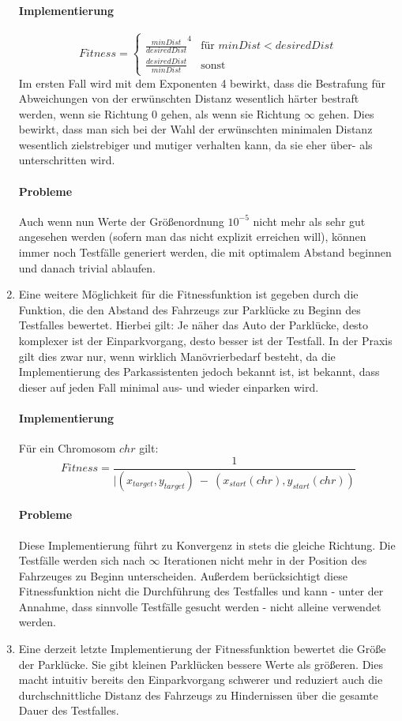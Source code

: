 \documentclass[12pt,a4paper]{scrartcl}
\begin{document}
\begin{enumerate}
	\paragraph{Implementierung}
	\begin{equation}
	Fitness = 
	\begin{cases}
		\frac{minDist}{desiredDist}^4 & \text{für } minDist < desiredDist \\
		\frac{desiredDist}{minDist} & \text{sonst}
	\end{cases}
	\end{equation}
	Im ersten Fall wird mit dem Exponenten 4 bewirkt, dass die Bestrafung für Abweichungen von der erwünschten Distanz wesentlich härter bestraft werden, wenn sie Richtung 0 gehen, als wenn sie Richtung $\infty$ gehen. Dies bewirkt, dass man sich bei der Wahl der erwünschten minimalen Distanz wesentlich zielstrebiger und mutiger verhalten kann, da sie eher über- als unterschritten wird.
	\paragraph{Probleme} Auch wenn nun Werte der Größenordnung $10^{-5}$ nicht mehr als sehr gut angesehen werden (sofern man das nicht explizit erreichen will), können immer noch Testfälle generiert werden, die mit optimalem Abstand beginnen und danach trivial ablaufen.
	\item Eine weitere Möglichkeit für die Fitnessfunktion ist gegeben durch die Funktion, die den Abstand des Fahrzeugs zur Parklücke zu Beginn des Testfalles bewertet. Hierbei gilt: Je näher das Auto der Parklücke, desto komplexer ist der Einparkvorgang, desto besser ist der Testfall. In der Praxis gilt dies zwar nur, wenn wirklich Manövrierbedarf besteht, da die Implementierung des Parkassistenten jedoch bekannt ist, ist bekannt, dass dieser auf jeden Fall minimal aus- und wieder einparken wird.
	\paragraph{Implementierung}
	Für ein Chromosom $chr$ gilt:
	\begin{equation}
		Fitness = \frac{1}{|(x_{target}, y_{target}) ~-~ (x_{start}(chr), y_{start}(chr))}
	\end{equation}
	\paragraph{Probleme} Diese Implementierung führt zu Konvergenz in stets die gleiche Richtung. Die Testfälle werden sich nach $\infty$ Iterationen nicht mehr in der Position des Fahrzeuges zu Beginn unterscheiden. Außerdem berücksichtigt diese Fitnessfunktion nicht die Durchführung des Testfalles und kann - unter der Annahme, dass sinnvolle Testfälle gesucht werden - nicht alleine verwendet werden.
	\item Eine derzeit letzte Implementierung der Fitnessfunktion bewertet die Größe der Parklücke. Sie gibt kleinen Parklücken bessere Werte als größeren. Dies macht intuitiv bereits den Einparkvorgang schwerer und reduziert auch die durchschnittliche Distanz des Fahrzeugs zu Hindernissen über die gesamte Dauer des Testfalles.

\end{enumerate}
\end{document}
